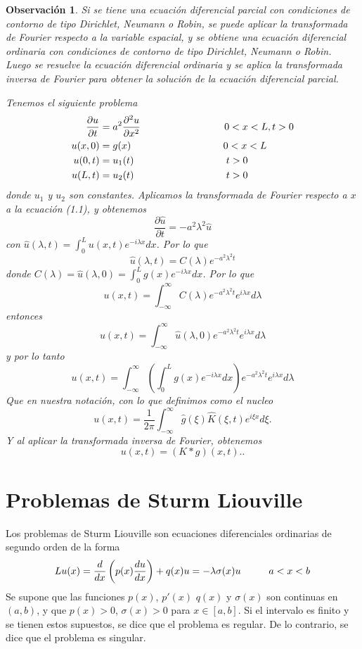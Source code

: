 \documentclass[11pt]{book}
\theoremstyle{plain}
\newtheorem{obs}[proposición]{Observación}
\theoremstyle{definition}
\begin{document}
\begin{obs}
    Si se tiene una ecuación diferencial parcial con condiciones de contorno de tipo Dirichlet, Neumann o Robin, se puede aplicar la transformada de Fourier respecto a la variable espacial, y se obtiene una ecuación diferencial ordinaria con condiciones de contorno de tipo Dirichlet, Neumann o Robin. Luego se resuelve la ecuación diferencial ordinaria y se aplica la transformada inversa de Fourier para obtener la solución de la ecuación diferencial parcial.

    Tenemos el siguiente problema
    \setcounter{equation}{0}
    \begin{align}
        \frac{\partial u}{\partial t} &= a^{2} \frac{\partial^2 u}{\partial x^2} \hspace{30mm} 0<x<L, t > 0\\ 
        u(x,0)&= g(x) \hspace{33mm} 0<x<L\\
        u(0,t)&= u_{1}(t) \hspace{33mm} t>0\\
        u(L,t)&= u_{2}(t) \hspace{33mm} t>0
    \end{align}
    donde $u_{1}$ y $u_{2}$ son constantes. Aplicamos la transformada de Fourier respecto a $x$ a la ecuación (1.1), y obtenemos
    \[
        \frac{\partial \hat{u}}{\partial t} = -a^{2}\lambda^{2}\hat{u}
    \]
    con $\hat{u}(\lambda,t) = \int_{0}^{L} u(x,t)e^{-i\lambda x}dx$. Por lo que
    \[
        \hat{u}(\lambda,t) = C(\lambda)e^{-a^{2}\lambda^{2}t}
    \]
    donde $C(\lambda) = \hat{u}(\lambda,0) = \int_{0}^{L} g(x)e^{-i\lambda x}dx$. Por lo que
    \[
        u(x,t) = \int_{-\infty}^{\infty} C(\lambda)e^{-a^{2}\lambda^{2}t}e^{i\lambda x}d\lambda
    \]
    entonces
    \[
        u(x,t) = \int_{-\infty}^{\infty} \hat{u}(\lambda,0)e^{-a^{2}\lambda^{2}t}e^{i\lambda x}d\lambda
    \]
    y por lo tanto
    \[
        u(x,t) = \int_{-\infty}^{\infty} \left(\int_{0}^{L} g(x)e^{-i\lambda x}dx\right)e^{-a^{2}\lambda^{2}t}e^{i\lambda x}d\lambda
    \]
    Que en nuestra notación, con lo que definimos como el nucleo
    \[
        u(x,t) = \frac{1}{2\pi}\int_{-\infty}^{\infty} \hat{g}(\xi)\hat{K}(\xi,t)e^{i\xi x}d\xi
    .\]
    Y al aplicar la transformada inversa de Fourier, obtenemos
    \[
        u(x,t) = (K * g)(x,t).
    .\]
\end{obs}

\chapter{Problemas de Sturm Liouville}
\minitoc
Los problemas de Sturm Liouville son ecuaciones diferenciales ordinarias de segundo orden de la forma
\[
    Lu(x) = \frac{d}{dx}\left(p(x)\frac{du}{dx}\right) + q(x)u = -\lambda \sigma(x)u \hspace{10mm} a<x<b
\]
Se supone que las funciones $p(x)$, $p'(x)$ $q(x)$ y $\sigma(x)$ son continuas en $(a,b)$, y que $p(x) > 0$, $\sigma(x) > 0$ para $x \in [a,b]$. Si el intervalo es finito y se tienen estos supuestos, se dice que el problema es regular. De lo contrario, se dice que el problema es singular.
\end{document}
